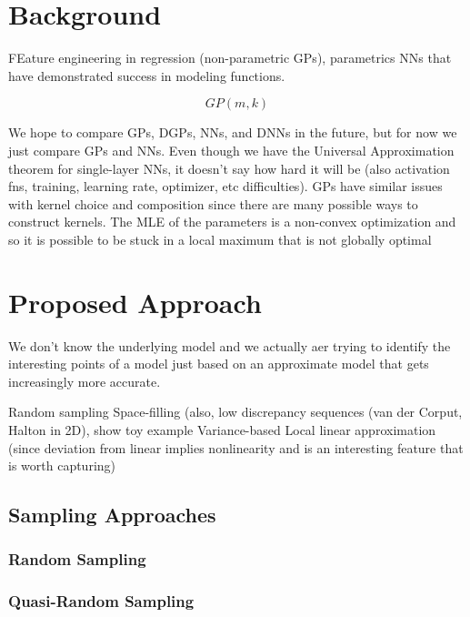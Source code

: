 \documentclass[conference]{IEEEtran}
\begin{document}
	\cite{Zuluaga2013ActiveOptimization}
	
	\section{Background}
	\label{sec:background}
	
	FEature engineering in regression (non-parametric GPs), parametrics NNs that have demonstrated success in modeling functions.
	
	\begin{equation*}
	GP(m, k)
	\end{equation*}
	
	We hope to compare GPs, DGPs, NNs, and DNNs in the future, but for now we just compare GPs and NNs. Even though we have the Universal Approximation theorem for single-layer NNs, it doesn't say how hard it will be (also activation fns, training, learning rate, optimizer, etc difficulties). GPs have similar issues with kernel choice and composition since there are many possible ways to construct kernels. The MLE of the parameters is a non-convex optimization and so it is possible to be stuck in a local maximum that is not globally optimal
	
	\section{Proposed Approach}
	\label{sec:proposed-approach}
	
	We don't know the underlying model and we actually aer trying to identify the interesting points of a model just based on an approximate model that gets increasingly more accurate.

	
	Random sampling
	Space-filling (also, low discrepancy sequences (van der Corput, Halton in 2D), show toy example
	Variance-based
	Local linear approximation (since deviation from linear implies nonlinearity and is an interesting feature that is worth capturing)
	
	\subsection{Sampling Approaches}
	
	\subsubsection{Random Sampling}
	
	\subsubsection{Quasi-Random Sampling}
	
\end{document}
